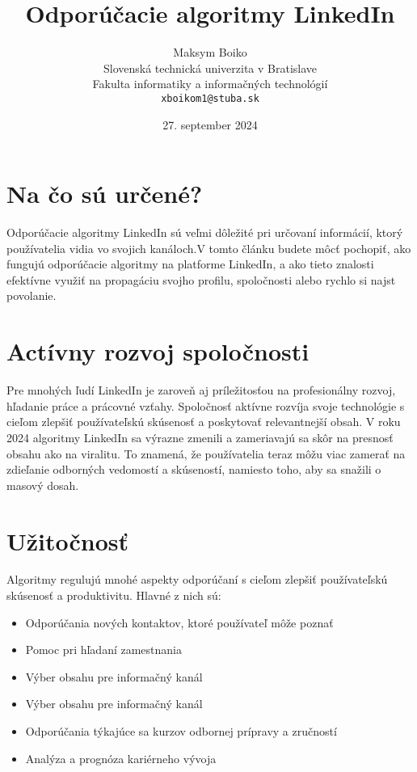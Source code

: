 \documentclass[twoside,slovak,a4paper]{coursepaper}
\title{Odporúčacie algoritmy LinkedIn\centering}
\author{Maksym Boiko\\[2pt]
{ Slovenská technická univerzita v Bratislave}\\
{ Fakulta informatiky a informačných technológií}\\
{ \texttt{xboikom1@stuba.sk}}
}
\date{\small 27. september 2024}
\begin{document}
\maketitle

\section{Na čo sú určené?}
Odporúčacie algoritmy LinkedIn sú veľmi dôležité pri určovaní informácií, ktorý používatelia vidia vo svojich kanáloch.V tomto článku budete môcť pochopiť, ako fungujú odporúčacie algoritmy na platforme LinkedIn, a ako tieto znalosti efektívne využiť na propagáciu svojho profilu, spoločnosti alebo rychlo si najst povolanie.

\section{Actívny rozvoj spoločnosti} \label{rozvoj spoločnosti}

Pre mnohých ľudí LinkedIn je zaroveň aj príležitosťou na profesionálny rozvoj, hľadanie práce a prácovné vzťahy.
Spoločnosť aktívne rozvíja svoje technológie s cieľom zlepšiť používateľskú skúsenosť a poskytovať relevantnejší obsah. V roku 2024 algoritmy LinkedIn sa výrazne zmenili a zameriavajú sa skôr na presnosť obsahu ako na viralitu. To znamená, že používatelia teraz môžu viac zamerať na zdieľanie odborných vedomostí a skúseností, namiesto toho, aby sa snažili o masový dosah.~\cite{Oladipo:article}

\section{Užitočnosť} \label{Užitočnosť}
Algoritmy regulujú mnohé aspekty odporúčaní s cieľom zlepšiť používateľskú skúsenosť a produktivitu. Hlavné z nich sú:

\begin{itemize}
	\item Odporúčania nových kontaktov, ktoré používateľ môže poznať
	\item Pomoc pri hľadaní zamestnania
	\item Výber obsahu pre informačný kanál
	\item Výber obsahu pre informačný kanál
	\item Odporúčania týkajúce sa kurzov odbornej prípravy a zručností
	\item Analýza a prognóza kariérneho vývoja
  \end{itemize}
\end{document}
